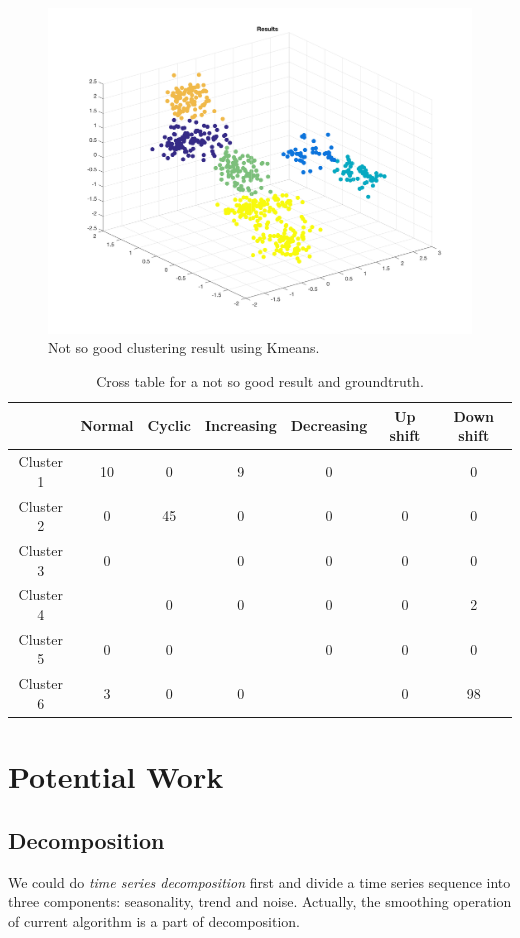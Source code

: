 \documentclass[a4paper]{article}
\begin{document}
\begin{figure}[htbp]
\centering
\includegraphics[width=1\textwidth]{badr.png}
\caption{\label{fig:badr}Not so good clustering result using Kmeans.}
\end{figure}

\begin{table}[htbp]
\caption{\label{tab:bad}Cross table for a not so good result and groundtruth.}
\centering
\begin{tabular}{|c|c|c|c|c|c|c|}
 \hline
  & Normal & Cyclic & Increasing& Decreasing & Up shift &Down shift\\
 \hline
Cluster 1 & 10& 0 & 9 & 0 & {\color{red}{100}}  & 0 \\
 \hline
Cluster 2 & 0 &45  & 0 & 0 & 0 & 0\\
 \hline
Cluster 3 & 0 & {\color{red}{55}}  & 0 & 0 & 0 & 0 \\
 \hline
Cluster 4 & {\color{red}{87}}  & 0 & 0 & 0 & 0 & 2\\
 \hline
 Cluster 5 & 0 & 0 & {\color{red}{91}}  & 0 & 0 & 0\\
 \hline
 Cluster 6 & 3 & 0 & 0 & {\color{red}{100}}  & 0 & 98\\
 \hline
\end{tabular}
\end{table}

\section{Potential Work}
\subsection{Decomposition}
We could do \emph{time series decomposition} first and divide a time series sequence into three components: seasonality, trend and noise. Actually, the smoothing operation of current algorithm is a part of decomposition.
\end{document}
